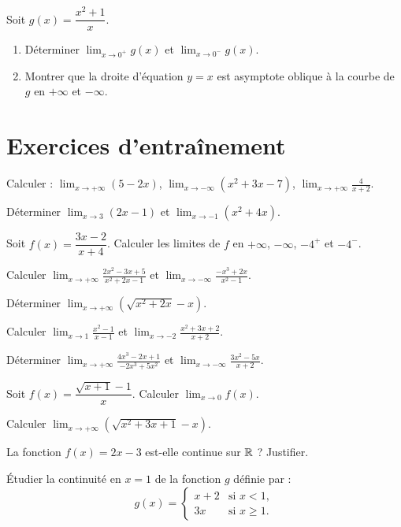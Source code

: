 \exo{}
Soit $g(x)=\dfrac{x^2+1}{x}$.
\begin{enumerate}[label=\alph*)]
\item Déterminer $\displaystyle\lim_{x\to 0^+} g(x)$ et $\displaystyle\lim_{x\to 0^-} g(x)$.
\item Montrer que la droite d'équation $y=x$ est asymptote oblique à la courbe de $g$ en $+\infty$ et $-\infty$.
\end{enumerate}

\section{Exercices d'entraînement}


\exo{}
Calculer : $\displaystyle\lim_{x\to +\infty} (5-2x)$, $\displaystyle\lim_{x\to -\infty} (x^2+3x-7)$, $\displaystyle\lim_{x\to +\infty} \frac{4}{x+2}$.

\exo{}
Déterminer $\displaystyle\lim_{x\to 3} (2x-1)$ et $\displaystyle\lim_{x\to -1} (x^2+4x)$.

\exo{}
Soit $f(x)=\dfrac{3x-2}{x+4}$. Calculer les limites de $f$ en $+\infty$, $-\infty$, $-4^+$ et $-4^-$.

\exo{}
Calculer $\displaystyle\lim_{x\to +\infty} \frac{2x^2-3x+5}{x^2+2x-1}$ et $\displaystyle\lim_{x\to -\infty} \frac{-x^3+2x}{x^2-1}$.

\exo{}
Déterminer $\displaystyle\lim_{x\to +\infty} (\sqrt{x^2+2x}-x)$.


\exo{}
Calculer $\displaystyle\lim_{x\to 1} \frac{x^2-1}{x-1}$ et $\displaystyle\lim_{x\to -2} \frac{x^2+3x+2}{x+2}$.

\exo{}
Déterminer $\displaystyle\lim_{x\to +\infty} \frac{4x^3-2x+1}{-2x^3+5x^2}$ et $\displaystyle\lim_{x\to -\infty} \frac{3x^2-5x}{x+2}$.

\exo{}
Soit $f(x)=\dfrac{\sqrt{x+1}-1}{x}$. Calculer $\displaystyle\lim_{x\to 0} f(x)$.

\exo{}
Calculer $\displaystyle\lim_{x\to +\infty} (\sqrt{x^2+3x+1}-x)$.


\exo{}
La fonction $f(x)=2x-3$ est-elle continue sur $\mathbb{R}$ ? Justifier.

\exo{}
Étudier la continuité en $x=1$ de la fonction $g$ définie par :
\[
g(x)=\begin{cases}
x+2 &\text{si } x<1,\\
3x &\text{si } x\geq 1.
\end{cases}
\]

